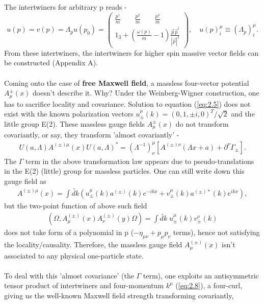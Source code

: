 \documentclass[12pt,a4paper]{article}
\numberwithin{equation}{section}
\begin{document}
The intertwiners for arbitrary p reads -
$$
u(p)=v(p)=\Lambda_{p} u\left(p_{0}\right)=\left(\begin{array}{ccc}
\frac{p^{1}}{m}\quad \quad \frac{p^{2}}{m}\quad \quad \frac{p^{3}}{m} \\
1_{3}+\left(\frac{\omega(p)}{m}-1\right) \frac{\vec{p} \vec{p}^{t}}{|\vec{p}|^{2}}
\end{array}\right), \quad u(p)_{i}^{\mu} \equiv\left(\Lambda_{p}\right)_{i}^{\mu}.
$$
From these intertwiners, the intertwiners for higher spin massive vector fields can be constructed (Appendix A).\\\\
Coming onto the case of \textbf{\textcolor{blue!50!black}{free Maxwell field}}, a massless four-vector potential $A^\pm_\mu(x)$ doesn't describe it. Why? Under the Weinberg-Wigner construction, one has to sacrifice locality and covariance. Solution to equation (\ref{eq:2.5}) does not exist with the known polarization vectors $u^\mu_\pm(k)=(0,1,\pm i,0)^T/\sqrt{2}$ and the little group E(2). These massless gauge fields $A^\pm_\mu(x)$ do not transform covariantly, or say, they transform 'almost covariantly' - 
\begin{align}\label{eq:2.6}
U(a, \Lambda) A^{(\pm) \mu}(x) U(a, \Lambda)^{*}=\left(\Lambda^{-1}\right)_{\nu}^{\mu}\left[A^{(\pm) \nu}(\Lambda x+a)+\partial^{\nu} \Gamma_{\pm}\right].
\end{align} 
The $\Gamma$ term in the above transformation law appears due to pseudo-translations in the E(2) (little) group for massless particles.
One can still write down this gauge field as 
\begin{align}
A^{(\pm)\mu}(x)=\int \widetilde{dk}\left( u^\mu_\pm(k)a^{(\pm)}(k)e^{-ikx}+v^\mu_\pm(k)a^{(\pm)*}(k)e^{ikx}\right),
\end{align}
but the two-point function of above such field
\begin{align*}
(\Omega,A^{(\pm)}_\mu(x)A^{(\pm)}_\nu(y)\Omega)=\int \widetilde{dk}\;u^\mu_\pm(k)v^\nu_\pm(k)
\end{align*} does not take form of a polynomial in p ($-\eta_{\mu\nu}+p_\mu p_\nu$ terms), hence not satisfying the locality/causality. Therefore, the massless gauge field $A_\mu^{(\pm)}(x)$ isn't associated to any physical one-particle state. \\\\
To deal with this 'almost covariance' (the $\Gamma$ term), one exploits an antisymmetric tensor product of intertwiners and four-momentum $k^\mu$ (\ref{eq:2.8}), a four-curl, giving us the well-known Maxwell field strength transforming covariantly, 
\end{document}

